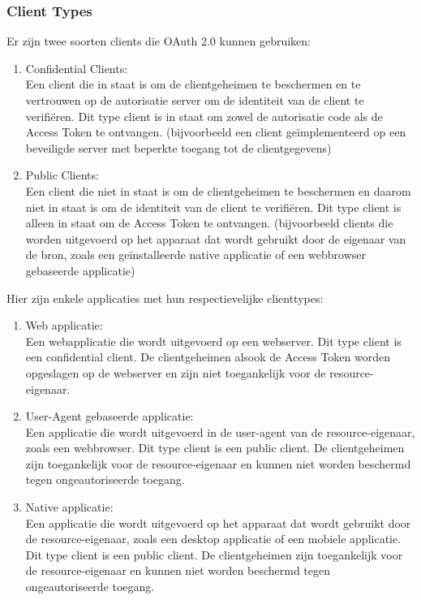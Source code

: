 \subsubsection{Client Types}%
\label{subsubsec:client-types}
Er zijn twee soorten clients die OAuth 2.0 kunnen gebruiken:
\begin{enumerate}[label=\textbf{-}]
    \item Confidential Clients: \\
    Een client die in staat is om de clientgeheimen te beschermen en te vertrouwen op de autorisatie server om de identiteit van de client te verifiëren. Dit type client is in staat om zowel de autorisatie code als de Access Token te ontvangen. (bijvoorbeeld een client geïmplementeerd op een beveiligde server met beperkte toegang tot de clientgegevens)
  
    \item Public Clients: \\
    Een client die niet in staat is om de clientgeheimen te beschermen en daarom niet in staat is om de identiteit van de client te verifiëren. Dit type client is alleen in staat om de Access Token te ontvangen. (bijvoorbeeld clients die worden uitgevoerd op het apparaat dat wordt gebruikt door de eigenaar van de bron, zoals een geïnstalleerde native applicatie of een webbrowser gebaseerde applicatie)
\end{enumerate}
Hier zijn enkele applicaties met hun respectievelijke clienttypes:
\begin{enumerate}[label=\textbf{-}]
    \item Web applicatie: \\
    Een webapplicatie die wordt uitgevoerd op een webserver. Dit type client is een confidential client. De clientgeheimen alsook de Access Token worden opgeslagen op de webserver en zijn niet toegankelijk voor de resource-eigenaar.
  
    \item User-Agent gebaseerde applicatie: \\
    Een applicatie die wordt uitgevoerd in de user-agent van de resource-eigenaar, zoals een webbrowser. Dit type client is een public client. De clientgeheimen zijn toegankelijk voor de resource-eigenaar en kunnen niet worden beschermd tegen ongeautoriseerde toegang.
  
    \item Native applicatie: \\
    Een applicatie die wordt uitgevoerd op het apparaat dat wordt gebruikt door de resource-eigenaar, zoals een desktop applicatie of een mobiele applicatie. Dit type client is een public client. De clientgeheimen zijn toegankelijk voor de resource-eigenaar en kunnen niet worden beschermd tegen ongeautoriseerde toegang.
\end{enumerate}
